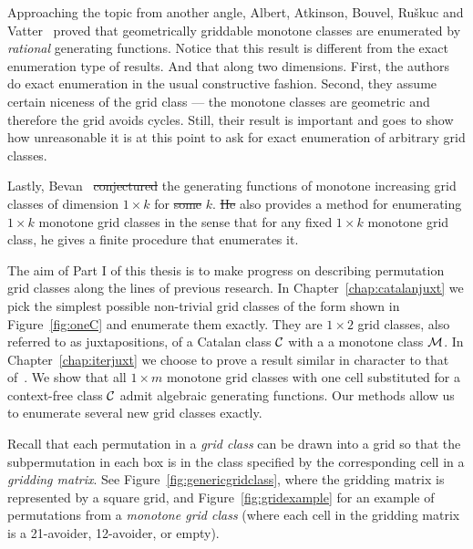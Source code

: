 \documentclass[12pt, a4paper, twoside]{report}
\providecommand{\DIFaddtex}[1]{{\protect\color{blue}\uwave{#1}}} %
\providecommand{\DIFdeltex}[1]{{\protect\color{red}\sout{#1}}}                      %
\providecommand{\DIFaddbegin}{} %
\providecommand{\DIFaddend}{} %
\providecommand{\DIFdelbegin}{} %
\providecommand{\DIFdelend}{} %
\providecommand{\DIFadd}[1]{\texorpdfstring{\DIFaddtex{#1}}{#1}} %
\providecommand{\DIFdel}[1]{\texorpdfstring{\DIFdeltex{#1}}{}} %
\begin{document}
Approaching the topic from another angle, Albert, Atkinson, Bouvel, Ru\v{s}kuc and Vatter~\cite{aabrv2013} proved that geometrically griddable monotone classes are enumerated by \emph{rational} generating functions. Notice that this result is different from the exact enumeration type of results. And that along two dimensions. First, the authors do exact enumeration in the usual constructive fashion. Second, they assume certain niceness of the grid class --- the monotone classes are geometric and therefore the grid avoids cycles. Still, their result is important and goes to show how unreasonable it is at this point to ask for exact enumeration of arbitrary grid classes.

Lastly, \DIFaddbegin \DIFadd{Conjecture 3.2 on page 34 of }\DIFaddend Bevan~\cite{bevan2015thesis} \DIFdelbegin \DIFdel{conjectured }\DIFdelend \DIFaddbegin \DIFadd{suggests }\DIFaddend the generating functions of monotone increasing grid classes of dimension $1\times k$ for \DIFdelbegin \DIFdel{some }\DIFdelend \DIFaddbegin \DIFadd{each }\DIFaddend $k$. \DIFdelbegin \DIFdel{He }\DIFdelend \DIFaddbegin \DIFadd{Bevan }\DIFaddend also provides a method for enumerating $1\times k$ monotone grid classes in the sense that for any fixed $1\times k$ monotone grid class, he gives a finite procedure that enumerates it.

The aim of Part I of this thesis is to make progress on describing permutation grid classes along the lines of previous research. In Chapter~\ref{chap:catalanjuxt} we pick the simplest possible non-trivial grid classes of the form shown in Figure~\ref{fig:oneC} and enumerate them exactly. They are $1\times 2$ grid classes, also referred to as juxtapositions, of a Catalan class $\mathcal{C}$ with a a monotone class $\mathcal{M}$. In Chapter~\ref{chap:iterjuxt} we choose to prove a result similar in character to that of~\cite{aabrv2013}. We show that all $1\times m$ monotone grid classes with one cell substituted for a context-free class $\mathcal{C}$ admit algebraic generating functions. Our methods allow us to enumerate several new grid classes exactly.

Recall that each permutation in a \emph{grid class} can be drawn into a grid so that the subpermutation in each box is in the class specified by the corresponding cell in a \emph{gridding matrix}. See Figure~\ref{fig:genericgridclass}, where the gridding matrix is represented by a square grid, and Figure~\ref{fig:gridexample}  for an example of permutations from a \emph{monotone grid class} (where each cell in the gridding matrix is a 21-avoider, 12-avoider, or empty).
\end{document}
